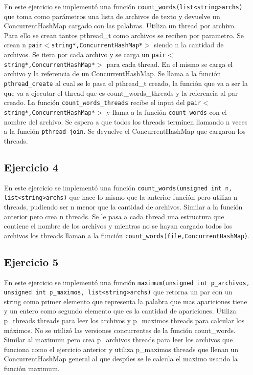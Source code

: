 \documentclass[a4paper]{article}
\begin{document}
{En este ejercicio se implementó una función {\tt count_words(list<string>archs)} que toma como parámetros una lista de archivos de texto y devuelve un ConcurrentHashMap cargado con las palabras. Utiliza un thread por archivo.
Para ello se crean tantos pthread_t como archivos se reciben por parametro. Se crean n {\tt pair$<$string*,ConcurrentHashMap*$>$} siendo n la cantidad de archivos. Se itera por cada archivo y se carga un {\tt pair$<$string*,ConcurrentHashMap*$>$} para cada thread. En el mismo se carga el archivo y la referencia de un ConcurrentHashMap. Se llama a la función {\tt pthread_create} al cual se le pasa el pthread_t creado, la función que va a ser la que va a ejecutar el thread que es count_words_threads y la referencia al par creado. La función {\tt count_words_threads} recibe el input del {\tt pair$<$string*,ConcurrentHashMap*$>$} y llama a la función {\tt count_words} con el nombre del archivo. Se espera a que todos los threads terminen llamando n veces a la función {\tt pthread_join}. Se devuelve el ConcurrentHashMap que cargaron los threads.

\subsection{Ejercicio 4}
En este ejercicio se implementó una función {\tt count_words(unsigned int n, list<string>archs)} que hace lo mismo que la anterior función pero utiliza n threads, pudiendo ser n menor que la cantidad de archivos. Similar a la función anterior pero crea n threads. Se le pasa a cada thread una estructura que contiene el nombre de los archivos y mientras no se hayan cargado todos los archivos los threads llaman a la función {\tt count_words(file,ConcurrentHashMap)}.

\subsection{Ejercicio 5}
En este ejercicio se implementó una función {\tt maximum(unsigned int p_archivos, unsigned int p_maximos, list<string>archs)} que retorna un par con un string como primer elemento que representa la palabra que mas apariciones tiene y un entero como segundo elemento que es la cantidad de apariciones. Utiliza p_threads threads para leer los archivos y p_maximos threads para calcular los máximos. No se utilizó las versiones concurrentes de la función count_words. Similar al maximum pero crea p_archivos threads para leer los archivos que funciona como el ejercicio anterior y utiliza p_maximos threads que llenan un ConcurrentHashMap general al que despúes se le calcula el maximo usando la función maximum.


}
\end{document}
